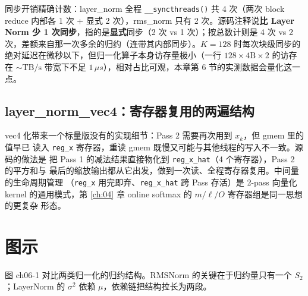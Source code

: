 同步开销精确计数：layer\_norm 全程 \texttt{\_\allowbreak{}\_\allowbreak{}syncthreads\allowbreak{}()} 共 4 次（两次 block reduce 内部各 1 次 + 显式 2 次），rms\_norm 只有 2 次。源码注释说\textbf{比 Layer Norm 少 1 次同步}，指的是\textbf{显式}同步（2 次 vs 1 次）；按总数计则是 4 次 vs 2 次，差额来自那一次多余的归约（连带其内部同步）。$K = 128$ 时每次块级同步的绝对延迟在微秒以下，但归一化算子本身访存量极小（一行 $128 \times 4\mathrm{B} \times 2$ 的访存在 $\sim\mathrm{TB/s}$ 带宽下不足 $1\,\mu s$），相对占比可观，本章第 6 节的实测数据会量化这一点。

\subsection{layer\_norm\_vec4：寄存器复用的两遍结构}



vec4 化带来一个标量版没有的实现细节：Pass 2 需要再次用到 $x_k$，但 gmem 里的值早已
读入 \texttt{reg\_x} 寄存器，重读 gmem 既慢又可能与其他线程的写入不一致。源码的做法是
把 Pass 1 的减法结果直接物化到 \texttt{reg\_x\_hat}（4 个寄存器），Pass 2 的平方和与
最后的缩放输出都从它出发，做到一次读、全程寄存器复用。中间量的生命周期管理
（\texttt{reg\_x} 用完即弃、\texttt{reg\_x\_hat} 跨 Pass 存活）是 2-pass 向量化 kernel
的通用模式，第 \ref{ch:04} 章 online softmax 的 $m/\ell/O$ 寄存器组是同一思想的更复杂
形态。

\section{图示}

图 ch06-1 对比两类归一化的归约结构。RMSNorm 的关键在于归约量只有一个 $S_2$；LayerNorm 的 $\sigma^2$ 依赖 $\mu$，依赖链把结构拉长为两段。

